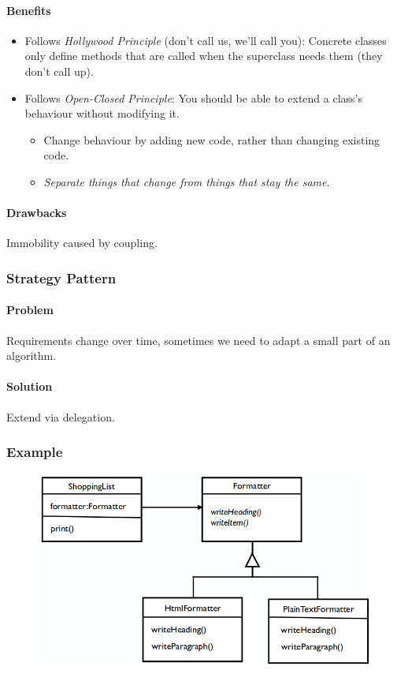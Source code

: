 \documentclass[twocolumn,english]{article}
\begin{document}
\paragraph{Benefits}
\begin{itemize}
\item Follows \emph{Hollywood Principle }(don't call us, we'll call you):
Concrete classes only define methods that are called when the superclass
needs them (they don't call up).
\item Follows \emph{Open-Closed Principle}: You should be able to extend
a class's behaviour without modifying it.
\begin{itemize}
\item Change behaviour by adding new code, rather than changing existing
code.
\item \emph{Separate things that change from things that stay the same}.
\end{itemize}
\end{itemize}

\paragraph{Drawbacks}

Immobility caused by coupling.

\subsubsection{Strategy Pattern}

\paragraph{Problem}

Requirements change over time, sometimes we need to adapt a small
part of an algorithm.

\paragraph{Solution}

Extend via delegation.

\subsubsection*{Example}

\begin{figure}[H]
\centering{}\includegraphics[width=0.6\columnwidth]{img/strategy}
\end{figure}
\end{document}
